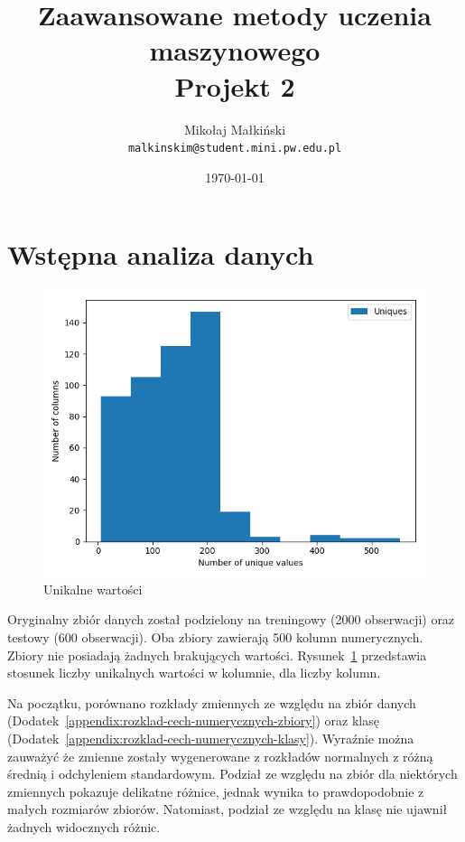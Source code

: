 \documentclass[a4paper,12pt]{article}
\title{
Zaawansowane metody uczenia maszynowego \\
Projekt 2
}
\author{
Mikołaj Małkiński \\
\texttt{malkinskim@student.mini.pw.edu.pl}
}
\date{\today}
\begin{document}
    \maketitle

    \section{Wstępna analiza danych}

    \begin{figure}
        \centering
        \includegraphics[width=\linewidth]{../images/uniqueness-train.png}
        \caption{Unikalne wartości}
        \label{fig:uniqueness-train}
    \end{figure}

    Oryginalny zbiór danych został podzielony na treningowy (2000 obserwacji) oraz testowy (600 obserwacji).
    Oba zbiory zawierają 500 kolumn numerycznych.
    Zbiory nie posiadają żadnych brakujących wartości.
    Rysunek~\ref{fig:uniqueness-train} przedstawia stosunek liczby unikalnych wartości w kolumnie, dla liczby kolumn.

    Na początku, porównano rozkłady zmiennych ze względu na zbiór danych (Dodatek~\ref{appendix:rozklad-cech-numerycznych-zbiory}) oraz klasę (Dodatek~\ref{appendix:rozklad-cech-numerycznych-klasy}).
    Wyraźnie można zauważyć że zmienne zostały wygenerowane z rozkładów normalnych z różną średnią i odchyleniem standardowym.
    Podział ze względu na zbiór dla niektórych zmiennych pokazuje delikatne różnice, jednak wynika to prawdopodobnie z małych rozmiarów zbiorów.
    Natomiast, podział ze względu na klasę nie ujawnił żadnych widocznych różnic.
\end{document}
